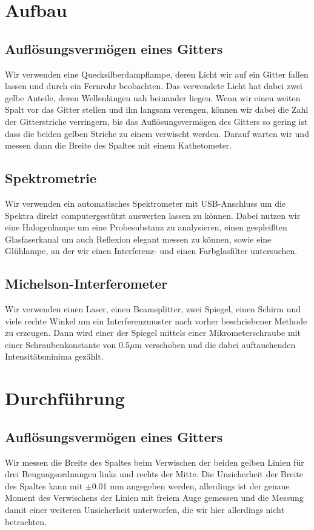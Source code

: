 \documentclass{article}
\begin{document}
\section{Aufbau}
\subsection{Auflösungsvermögen eines Gitters}
Wir verwenden eine Quecksilberdampflampe, deren Licht wir auf ein Gitter fallen lassen und durch ein Fernrohr beobachten. Das verwendete Licht hat dabei zwei gelbe Anteile, deren Wellenlängen nah beinander liegen. Wenn wir einen weiten Spalt vor das Gitter stellen und ihn langsam verengen, können wir dabei die Zahl der Gitterstriche verringern, bis das Auflösungsvermögen des Gitters so gering ist dass die beiden gelben Striche zu einem verwischt werden. Darauf warten wir und messen dann die Breite des Spaltes mit einem Kathetometer.
\subsection{Spektrometrie}
Wir verwenden ein automatisches Spektrometer mit USB-Anschluss um die Spektra direkt computergestützt auswerten lassen zu können. Dabei nutzen wir eine Halogenlampe um eine Probesubstanz zu analysieren, einen gespleißten Glasfaserkanal um auch Reflexion elegant messen zu können, sowie eine Glühlampe, an der wir einen Interferenz- und einen Farbglasfilter untersuchen.
\subsection{Michelson-Interferometer}
Wir verwenden einen Laser, einen Beamsplitter, zwei Spiegel, einen Schirm und viele rechte Winkel um ein Interferenzmuster nach vorher beschriebener Methode zu erzeugen. Dann wird einer der Spiegel mittels einer Mikrometerschraube mit einer Schraubenkonstante von 0.5$\mu$m verschoben und die dabei auftauchenden Intensitätsminima gezählt. 
\section{Durchführung}
\subsection{Auflösungsvermögen eines Gitters}
Wir messen die Breite des Spaltes beim Verwischen der beiden gelben Linien für drei Beugungsordnungen links und rechts der Mitte. Die Unsicherheit der Breite des Spaltes kann mit $\pm$0.01 mm angegeben werden, allerdings ist der genaue Moment des Verwischens der Linien mit freiem Auge gemessen und die Messung damit einer weiteren Unsicherheit unterworfen, die wir hier allerdings nicht betrachten.
\end{document}
